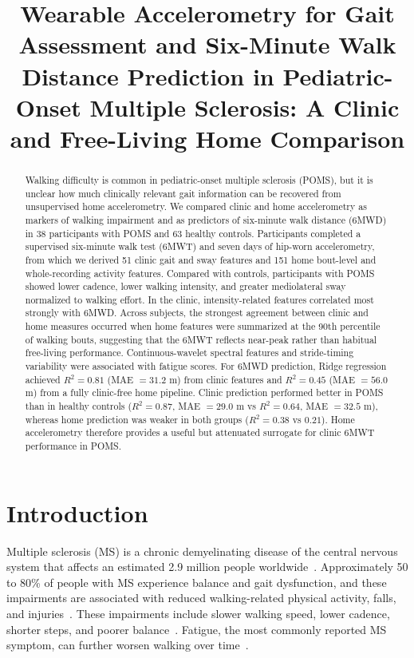 \documentclass{article}
\begin{document}
\title{Wearable Accelerometry for Gait Assessment and Six-Minute Walk Distance Prediction in Pediatric-Onset Multiple Sclerosis: A Clinic and Free-Living Home Comparison}



\maketitle

\begin{abstract}
Walking difficulty is common in pediatric-onset multiple sclerosis (POMS), but it is unclear how much clinically relevant gait information can be recovered from unsupervised home accelerometry. We compared clinic and home accelerometry as markers of walking impairment and as predictors of six-minute walk distance (6MWD) in 38 participants with POMS and 63 healthy controls. Participants completed a supervised six-minute walk test (6MWT) and seven days of hip-worn accelerometry, from which we derived 51 clinic gait and sway features and 151 home bout-level and whole-recording activity features. Compared with controls, participants with POMS showed lower cadence, lower walking intensity, and greater mediolateral sway normalized to walking effort. In the clinic, intensity-related features correlated most strongly with 6MWD. Across subjects, the strongest agreement between clinic and home measures occurred when home features were summarized at the 90th percentile of walking bouts, suggesting that the 6MWT reflects near-peak rather than habitual free-living performance. Continuous-wavelet spectral features and stride-timing variability were associated with fatigue scores.
For 6MWD prediction, Ridge regression achieved $R^2 = 0.81$ (MAE $= 31.2$ m) from clinic features and $R^2 = 0.45$ (MAE $= 56.0$ m) from a fully clinic-free home pipeline. Clinic prediction performed better in POMS than in healthy controls ($R^2 = 0.87$, MAE $= 29.0$ m vs $R^2 = 0.64$, MAE $= 32.5$ m), whereas home prediction was weaker in both groups ($R^2 = 0.38$ vs $0.21$). Home accelerometry therefore provides a useful but attenuated surrogate for clinic 6MWT performance in POMS.
\end{abstract}



\section{Introduction}\label{sec:intro}

Multiple sclerosis (MS) is a chronic demyelinating disease of the central nervous system that affects an estimated 2.9 million people worldwide~\cite{msif_atlas_2023_prevalence}. Approximately 50 to 80\% of people with MS experience balance and gait dysfunction, and these impairments are associated with reduced walking-related physical activity, falls, and injuries~\cite{cameron2018balance}. These impairments include slower walking speed, lower cadence, shorter steps, and poorer balance~\cite{sosnoff2012quantifying, kalron2015association, hobart2003measuring}. Fatigue, the most commonly reported MS symptom, can further worsen walking over time~\cite{freal1984symptomatic, krupp1989fatigue, confavreux2000relapses}.
\end{document}
